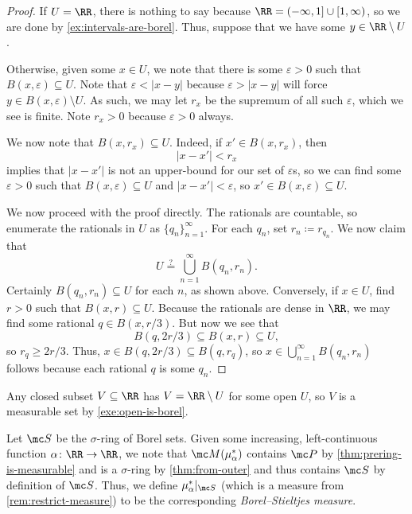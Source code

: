 \documentclass[../notes.tex]{subfiles}
\begin{document}
\begin{proof}
	If $U=\RR$, there is nothing to say because $\RR=(-\infty,1]\cup[1,\infty)$, so we are done by \autoref{ex:intervals-are-borel}. Thus, suppose that we have some $y\in\RR\setminus U$.

	Otherwise, given some $x\in U$, we note that there is some $\varepsilon>0$ such that $B(x,\varepsilon)\subseteq U$. Note that $\varepsilon<|x-y|$ because $\varepsilon>|x-y|$ will force $y\in B(x,\varepsilon)\setminus U$. As such, we may let $r_x$ be the supremum of all such $\varepsilon$, which we see is finite. Note $r_x>0$ because $\varepsilon>0$ always.

	We now note that $B(x,r_x)\subseteq U$. Indeed, if $x'\in B(x,r_x)$, then
	\[|x-x'|<r_x\]
	implies that $|x-x'|$ is not an upper-bound for our set of $\varepsilon$s, so we can find some $\varepsilon>0$ such that $B(x,\varepsilon)\subseteq U$ and $|x-x'|<\varepsilon$, so $x'\in B(x,\varepsilon)\subseteq U$.

	We now proceed with the proof directly. The rationals are countable, so enumerate the rationals in $U$ as $\{q_n\}_{n=1}^\infty$. For each $q_n$, set $r_n\coloneqq r_{q_n}$. We now claim that
	\[U\stackrel?=\bigcup_{n=1}^\infty B(q_n,r_n).\]
	Certainly $B(q_n,r_n)\subseteq U$ for each $n$, as shown above. Conversely, if $x\in U$, find $r>0$ such that $B(x,r)\subseteq U$. Because the rationals are dense in $\RR$, we may find some rational $q\in B(x,r/3)$. But now we see that
	\[B(q,2r/3)\subseteq B(x,r)\subseteq U,\]
	so $r_q\ge2r/3$. Thus, $x\in B(q,2r/3)\subseteq B(q,r_q)$, so $x\in\bigcup_{n=1}^\infty B(q_n,r_n)$ follows because each rational $q$ is some $q_n$.
\end{proof}
\begin{example} \label{ex:closed-is-borel}
	Any closed subset $V\subseteq\RR$ has $V=\RR\setminus U$ for some open $U$, so $V$ is a measurable set by \autoref{exe:open-is-borel}.
\end{example}
\begin{definition}
	Let $\mc S$ be the $\sigma$-ring of Borel sets. Given some increasing, left-continuous function $\alpha\colon\RR\to\RR$, we note that $\mc M(\mu_\alpha^*)$ contains $\mc P$ by \autoref{thm:prering-is-measurable} and is a $\sigma$-ring by \autoref{thm:from-outer} and thus contains $\mc S$ by definition of $\mc S$. Thus, we define $\mu_\alpha^*|_{\mc S}$ (which is a measure from \autoref{rem:restrict-measure}) to be the corresponding \textit{Borel--Stieltjes measure}.
\end{definition}
\end{document}
